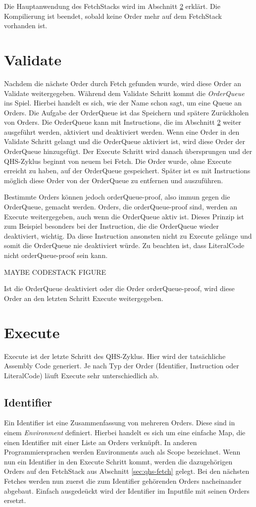 Die Hauptanwendung des FetchStacks wird im Abschnitt \ref{sec:qhs-execute} erklärt.
Die Kompilierung ist beendet, sobald keine Order mehr auf dem FetchStack vorhanden ist.

\section{Validate} \label{sec:qhs-Validate}
Nachdem die nächste Order durch Fetch gefunden wurde, wird diese Order an Validate weitergegeben. Während dem Validate Schritt kommt die \textit{OrderQueue} ins Spiel. Hierbei handelt es sich, wie der Name schon sagt, um eine Queue an Orders.
Die Aufgabe der OrderQueue ist das Speichern und spätere Zurückholen von Orders. Die OrderQueue kann mit Instructions, die im Abschnitt \ref{sec:qhs-execute} weiter ausgeführt werden, aktiviert und deaktiviert werden.
Wenn eine Order in den Validate Schritt gelangt und die OrderQueue aktiviert ist, wird diese Order der OrderQueue hinzugefügt. Der Execute Schritt wird danach übersprungen und der QHS-Zyklus beginnt von neuem bei Fetch.
Die Order wurde, ohne Execute erreicht zu haben, auf der OrderQueue gespeichert. Später ist es mit Instructions möglich diese Order von der OrderQueue zu entfernen und auszuführen.

Bestimmte Orders können jedoch orderQueue-proof, also immun gegen die OrderQueue, gemacht werden. Orders, die orderQueue-proof sind, werden an Execute weitergegeben, auch wenn die OrderQueue aktiv ist.
Dieses Prinzip ist zum Beispiel besonders bei der Instruction, die die OrderQueue wieder deaktiviert, wichtig. Da diese Instruction ansonsten nicht zu Execute gelänge und somit die OrderQueue nie deaktiviert würde.
Zu beachten ist, dass LiteralCode nicht orderQueue-proof sein kann.

MAYBE CODESTACK FIGURE

Ist die OrderQueue deaktiviert oder die Order orderQueue-proof, wird diese Order an den letzten Schritt Execute weitergegeben.

\section{Execute} \label{sec:qhs-execute}
Execute ist der letzte Schritt des QHS-Zyklus. Hier wird der tatsächliche Assembly Code generiert. Je nach Typ der Order (Identifier, Instruction oder LiteralCode) läuft Execute sehr unterschiedlich ab.

\subsection{Identifier}
Ein Identifier ist eine Zusammenfassung von mehreren Orders. Diese sind in einem \textit{Environment} definiert.
Hierbei handelt es sich um eine einfache Map, die einen Identifier mit einer Liste an Orders verknüpft.
In anderen Programmiersprachen werden Environments auch als Scope bezeichnet.
Wenn nun ein Identifier in den Execute Schritt kommt, werden die dazugehörigen Orders auf den FetchStack aus Abschnitt \ref{sec:qhs-fetch} gelegt.
Bei den nächsten Fetches werden nun zuerst die zum Identifier gehörenden Orders nacheinander abgebaut. Einfach ausgedeückt wird der Identifier im Inputfile mit seinen Orders ersetzt.

